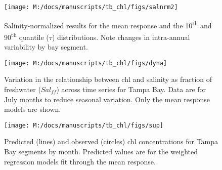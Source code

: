 \documentclass{svjour3}\usepackage[]{graphicx}\usepackage[]{color}
\newcommand{\beginsupplement}{%
        \setcounter{table}{0}
        \renewcommand{\thetable}{S\arabic{table}}%
        \setcounter{figure}{0}
        \renewcommand{\thefigure}{S\arabic{figure}}%
     }
\begin{document}
\begin{figure}[!ht]


{\centering \texttt{[image: M:/docs/manuscripts/tb\_chl/figs/salnrm2]} 

}

\caption[Salinity-normalized results for the mean response and the 10\textsuperscript{th} and 90\textsuperscript{th} quantile ($\tau$) distributions]{Salinity-normalized results for the mean response and the 10\textsuperscript{th} and 90\textsuperscript{th} quantile ($\tau$) distributions. Note changes in intra-annual variability by bay segment.\label{fig:salnrm2}}
\end{figure}



\begin{figure}[!ht]


{\centering \texttt{[image: M:/docs/manuscripts/tb\_chl/figs/dyna]} 

}

\caption[Variation in the relationship between \ac{chl} and salinity as fraction of freshwater ($Sal_{ff}$) across time series for Tampa Bay]{Variation in the relationship between \ac{chl} and salinity as fraction of freshwater ($Sal_{ff}$) across time series for Tampa Bay. Data are for July months to reduce seasonal variation. Only the mean response models are shown.\label{fig:dyna}}
\end{figure}



\beginsupplement
\begin{landscape}
\centering\vspace*{\fill}
\begin{figure}[!ht]


{\centering \texttt{[image: M:/docs/manuscripts/tb\_chl/figs/sup]} 

}

\caption[Predicted (lines) and observed (circles) \ac{chl} concentrations for Tampa Bay segments by month]{Predicted (lines) and observed (circles) \ac{chl} concentrations for Tampa Bay segments by month.  Predicted values are for the weighted regression models fit through the mean response.\label{fig:sup}}
\end{figure}


\vfill
\end{landscape}
\end{document}
